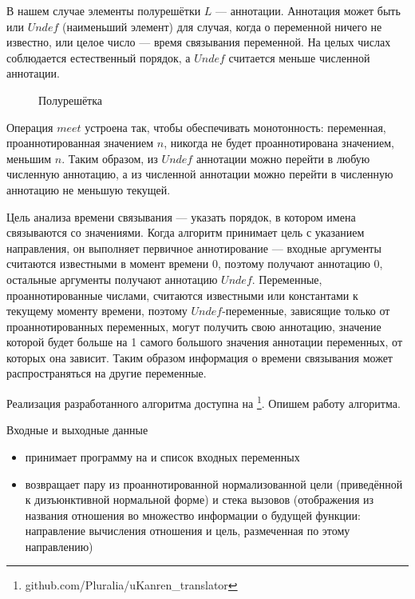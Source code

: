 \documentclass[conference]{IEEEtran}
\begin{document}
В нашем случае элементы полурешётки $L$ --- аннотации. Аннотация может быть или $Undef$ (наименьший элемент) для случая, когда о переменной ничего не известно, или целое число --- время связывания переменной. На целых числах соблюдается естественный порядок, а $Undef$ считается меньше численной аннотации. 

\begin{figure}[htbp]
  \centering
  \caption{Полурешётка}
  \label{fig:image}
\end{figure}

Операция $meet$ устроена так, чтобы обеспечивать монотонность: переменная, проаннотированная значением $n$, никогда не будет проаннотирована значением, меньшим $n$. Таким образом, из $Undef$ аннотации можно перейти в любую численную аннотацию, а из численной аннотации можно перейти в численную аннотацию не меньшую текущей.

Цель анализа времени связывания — указать порядок, в котором имена связываются со значениями. Когда алгоритм принимает цель с указанием направления, он выполняет первичное аннотирование --- входные аргументы считаются известными в момент времени 0, поэтому получают аннотацию 0, остальные аргументы получают аннотацию $Undef$. Переменные, проаннотированные числами, считаются известными или константами к текущему моменту времени, поэтому $Undef$-переменные, зависящие только от проаннотированных переменных, могут получить свою аннотацию, значение которой будет больше на 1 самого большого значения аннотации переменных, от которых она зависит. Таким образом информация о времени связывания может распространяться на другие переменные.

Реализация разработанного алгоритма доступна на \github{}\footnote{github.com/Pluralia/uKanren\_translator}. Опишем работу алгоритма.

Входные и выходные данные
\begin{itemize}
    \item принимает программу на \miniKanren{} и список входных переменных
    \item возвращает пару из проаннотированной нормализованной цели (приведённой к дизъюнктивной нормальной форме) и стека вызовов (отображения из названия отношения во множество информации о будущей функции: направление вычисления отношения и цель, размеченная по этому направлению)
\end{itemize}
\end{document}

